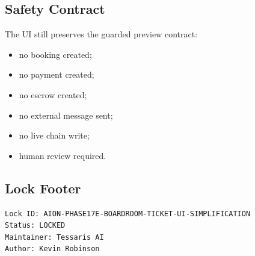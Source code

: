 \subsection{Safety Contract}

The UI still preserves the guarded preview contract:

\begin{itemize}
  \item no booking created;
  \item no payment created;
  \item no escrow created;
  \item no external message sent;
  \item no live chain write;
  \item human review required.
\end{itemize}

\subsection{Lock Footer}

\begin{verbatim}
Lock ID: AION-PHASE17E-BOARDROOM-TICKET-UI-SIMPLIFICATION
Status: LOCKED
Maintainer: Tessaris AI
Author: Kevin Robinson
\end{verbatim}
